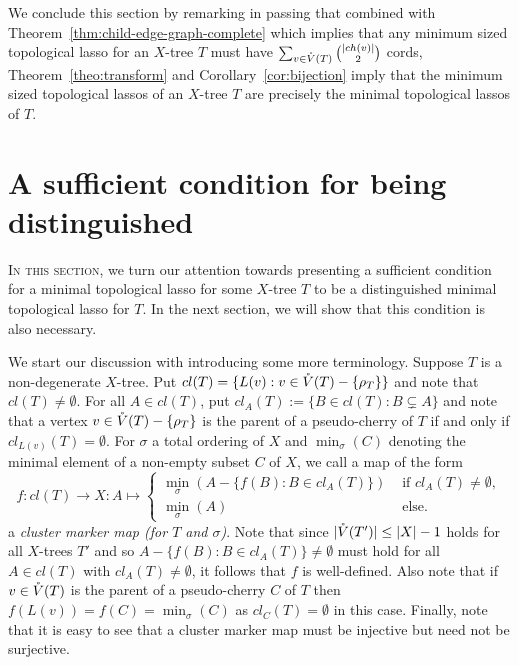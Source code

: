 We conclude this section by remarking in passing that combined with
Theorem~\ref{thm:child-edge-graph-complete} which implies that any minimum
sized topological lasso for an $X$-tree $T$ must have $\sum_{v\in
  \mathring{V}(T)}{|ch(v)|\choose 2}$ cords, Theorem~\ref{theo:transform} and
Corollary~\ref{cor:bijection} imply that the minimum sized topological lassos
of an $X$-tree $T$ are precisely the minimal topological lassos of $T$.
 
\section{A sufficient condition for being distinguished}
\label{sec:sufficient}

\textsc{In this section}, we turn our attention towards presenting a sufficient
condition for a minimal topological lasso for some $X$-tree $T$ to be a
distinguished minimal topological lasso for $T$.  In the next section, we will
show that this condition is also necessary.

We start our discussion with introducing some more terminology.  Suppose $T$
is a non-degenerate $X$-tree. Put $cl(T)=\{L(v): v\in \mathring{V}(T)-\{\rho_T\}\}$ and
note that $cl(T)\not=\emptyset$. For all $A\in cl(T)$, put $cl_A(T):=\{B\in
cl(T): B\subsetneq A\}$ and note that a vertex $v\in \mathring{V}(T)-\{\rho_T\}$ is the
parent of a pseudo-cherry of $T$ if and only if $cl_{L(v)}(T)=\emptyset$.  For
$\sigma$ a total ordering of $X$ and $\min_{\sigma}(C)$ denoting the minimal
element of a non-empty subset $C$ of $X$, we call a map of the form
$$
f:cl(T)\to X:
A\mapsto \left\{\begin{array}{cc}
\min_{\sigma}(A-\{f(B): B\in cl_A(T)\})
 & \mbox{ if }cl_A(T)\not=\emptyset,\\
\min_{\sigma}(A)  & \mbox{ else. }
\end{array}
\right.
$$ 
a {\em cluster marker map (for $T$ and $\sigma$)}.  Note that since
$|\mathring{V}(T')|\leq |X|-1$ holds for all $X$-trees $T'$ and so $A-\{f(B): B\in
cl_A(T)\}\not=\emptyset$ must hold for all $A\in cl(T)$ with
$cl_A(T)\not=\emptyset $, it follows that $f$ is well-defined.  Also note that
if $v\in \mathring{V}(T)$ is the parent of a pseudo-cherry $C$ of $T$ then
$f(L(v))=f(C)= \min_{\sigma}(C)$ as $cl_C(T)=\emptyset$ in this case. Finally,
note that it is easy to see that a cluster marker map must be injective but
need not be surjective.


